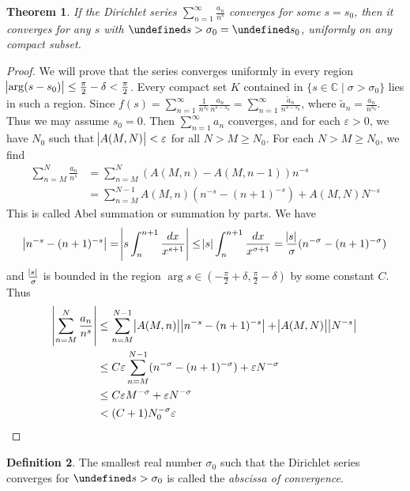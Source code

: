 \documentclass[11pt]{article}
\theoremstyle{definition}
\newtheorem{definition}{Definition}[section]
\theoremstyle{plain}
\newtheorem{theorem}[definition]{Theorem}
\theoremstyle{remark}
\let\Re\undefined
\DeclareMathOperator{\Re}{Re}
\newcommand{\CC}{\mathbb{C}}
\begin{document}
\begin{theorem}\label{thm:5_2}
    If the Dirichlet series $\sum_{n=1}^\infty \frac{a_n}{n^s}$ converges for some $s = s_0$, then it converges for any $s$ with $\Re s > \sigma_0 = \Re s_0$, uniformly on any compact subset.
\end{theorem}
\begin{proof}
    We will prove that the series converges uniformly in every region $\abs{\arg(s-s_0)} \le \frac{\pi}{2} - \delta < \frac{\pi}{2}$. Every compact set $K$ contained in $\{s \in \CC \mid \sigma > \sigma_0 \}$ lies in such a region. Since $f(s) = \sum_{n=1}^\infty \frac{1}{n^{s_0}} \frac{a_n}{n^{s-s_0}} = \sum_{n=1}^{\infty} \frac{\widetilde{a}_n}{n^{s-s_0}}$, where $\widetilde{a}_n = \frac{a_n}{n^{s_0}}$. Thus we may assume $s_0 = 0$. Then $\sum_{n=1}^\infty a_n$ converges, and for each $\varepsilon > 0$, we have $N_0$ such that $\abs{A(M, N)} < \varepsilon$ for all $N > M \ge N_0$. For each $N > M \ge N_0$, we find
    \begin{align*}
        \sum_{n=M}^{N} \frac{a_n}{n^s}
        &= \sum_{n=M}^{N} (A(M,n) - A(M,n-1)) n^{-s}\\
        &= \sum_{n=M}^{N-1} A(M,n) (n^{-s} - (n+1)^{-s}) + A(M, N) N^{-s}
    \end{align*}
    This is called Abel summation or summation by parts. We have
    \begin{equation*}
        \abs{n^{-s} - (n+1)^{-s}} = \abs{s \int_{n}^{n+1} \frac{dx}{x^{s+1}}} \le \abs{s} \int_{n}^{n+1} \frac{dx}{x^{\sigma+1}} = \frac{\abs{s}}{\sigma} (n^{-\sigma} - (n+1)^{-\sigma})
    \end{equation*}
    and $\frac{\abs{s}}{\sigma}$ is bounded in the region $\arg s \in (-\frac{\pi}{2} + \delta, \frac{\pi}{2} - \delta)$ by some constant $C$. Thus
    \begin{align*}
        \abs{\sum_{n=M}^{N} \frac{a_n}{n^s}}
        &\le \sum_{n=M}^{N-1} \abs{A(M,n)} \abs{n^{-s} - (n+1)^{-s}} + \abs{A(M, N)} \abs{N^{-s}}\\
        &\le C \varepsilon \sum_{n=M}^{N-1} (n^{-\sigma} - (n+1)^{-\sigma}) + \varepsilon N^{-\sigma}\\
        &\le C \varepsilon M^{-\sigma} + \varepsilon N^{-\sigma}\\
        &< (C + 1) N_0^{-\sigma} \varepsilon
    \end{align*}
\end{proof}

\begin{definition}\label{def:5_3}
    The smallest real number $\sigma_0$ such that the Dirichlet series converges for $\Re s > \sigma_0$ is called the \emph{abscissa of convergence}.
\end{definition}
\end{document}

